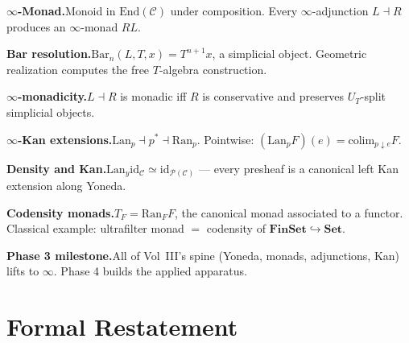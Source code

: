 \begin{summarybox}
\textbf{$\infty$-Monad.}\quad Monoid in $\mathrm{End}(\mathcal{C})$ under
composition. Every $\infty$-adjunction $L \dashv R$ produces an
$\infty$-monad $RL$.

\textbf{Bar resolution.}\quad $\mathrm{Bar}_n(L, T, x) = T^{n+1} x$,
a simplicial object. Geometric realization computes the free $T$-algebra
construction.

\textbf{$\infty$-monadicity.}\quad $L \dashv R$ is monadic iff $R$ is
conservative and preserves $U_T$-split simplicial objects.

\textbf{$\infty$-Kan extensions.}\quad $\mathrm{Lan}_p \dashv p^* \dashv
\mathrm{Ran}_p$. Pointwise: $(\mathrm{Lan}_p F)(e) = \mathrm{colim}_{p \downarrow e} F$.

\textbf{Density and Kan.}\quad $\mathrm{Lan}_y \mathrm{id}_\mathcal{C}
\simeq \mathrm{id}_{\mathcal{P}(\mathcal{C})}$ — every presheaf is a
canonical left Kan extension along Yoneda.

\textbf{Codensity monads.}\quad $T_F = \mathrm{Ran}_F F$, the canonical
monad associated to a functor. Classical example: ultrafilter monad
$=$ codensity of $\mathbf{FinSet} \hookrightarrow \mathbf{Set}$.

\textbf{Phase 3 milestone.}\quad All of Vol~III's spine
(Yoneda, monads, adjunctions, Kan) lifts to $\infty$. Phase 4 builds the
applied apparatus.
\end{summarybox}


\section*{Formal Restatement}

